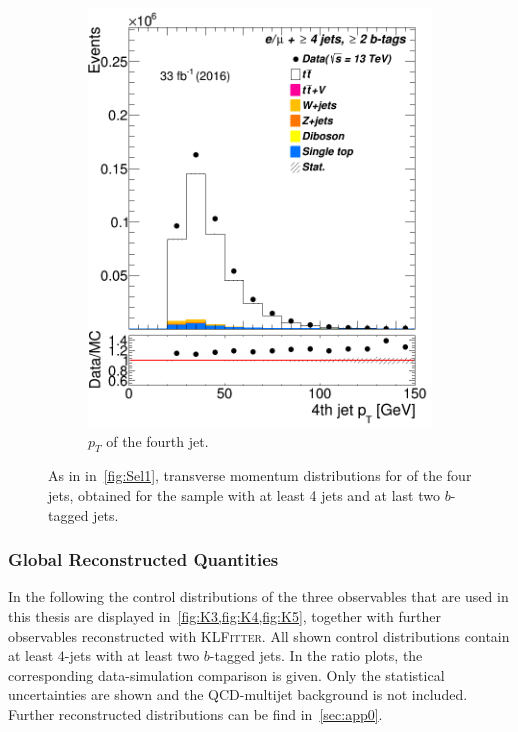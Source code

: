 \begin{figure} [t]
\begin{subfigure}{0.25\textwidth}
		\includegraphics[width=\linewidth]{ControlPlots_emujets_2016_4incl_2incl/jet3_pt_emujets_2016.png}
		\caption{$p_T$ of the fourth jet.} \label{fig:Sec28}
	\end{subfigure}
	
	
	\caption{As in in~\cref{fig:Sel1}, transverse momentum distributions  for of the four jets, obtained for the sample with at least 4 jets and at last two $b$-tagged jets.}
	\label{fig:Sel4}
\end{figure}



\subsubsection{Global Reconstructed Quantities}


In the following the control distributions of the three observables that are used in this thesis are displayed in~\cref{fig:K3,fig:K4,fig:K5}, together with further  observables  reconstructed with \textsc{KLFitter}. 
All shown control distributions contain at least $4$-jets with at least two $b$-tagged jets.  In the ratio plots, the  corresponding data-simulation comparison is given. Only the statistical uncertainties are shown and the QCD-multijet background is not included. Further reconstructed distributions can be find in~\cref{sec:app0}. 



